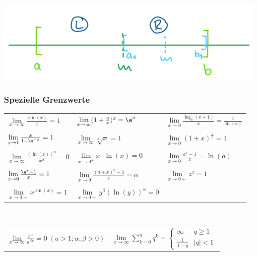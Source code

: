 		\includegraphics[width=0.9\linewidth]{Bilder/bisektion}
						
			
			\subsubsection{Spezielle Grenzwerte}	
			\begin{tabular}{lll}
			$\lim\limits_{x \to \infty} \frac{\sin(x)}{x} = 1$ &  $\lim\limits_{x \to \infty} (1 + \frac{a}{x})^x = \e^a$ & $\lim\limits_{x \to 0} \frac{\log_a(x+1)}{x} = \frac{1}{\ln(a)}$  \\
			\\
				$\lim\limits_{x \to 1} \frac{x}{1-\e^{-x}} = 1$ & $\lim\limits_{x \to \infty} \sqrt[x]{x} = 1$  & $\lim\limits_{x \to 0} (1+x)^{\frac{1}{x}} = 1$ \\
				\\
			$\lim\limits_{x \to \infty} \frac{(\ln(x))^\alpha}{x^\beta} = 0$ & $\lim\limits_{x \to 0^+} x \cdot \ln(x) = 0$  & $\lim\limits_{x \to 0} \frac{a^x -1}{x} = \ln(a)$ \\
			\\
			$\lim\limits_{x \to 0} \frac{\e^x - 1}{x} = 1$ & $\lim\limits_{x \to 0} \frac{(a+x)^\alpha -1}{x} = \alpha$  & $\lim\limits_{x \to 0+} z^z = 1$ \\
			\\
			$\lim\limits_{x \to 0+} x^{\sin(x)} = 1$ & $\lim\limits_{x \to 0+} y^{\beta} (\ln(y))^{\alpha} = 0 $ &  \\
			\end{tabular}
			\\
			
			\begin{tabular}{ll}
			$\lim\limits_{x \to \infty} \frac{x^\alpha}{a^{\beta x}} = 0 \; (a > 1; \alpha, \beta > 0)$  & $\lim\limits_{x \to \infty} \sum\limits _{k=0}^n q^k = \begin{cases}			
									\infty & q \geq 1 \\
									\frac{1}{1-q} & \vert q \vert < 1
								\end{cases} $ \\ 
			\end{tabular}
					
